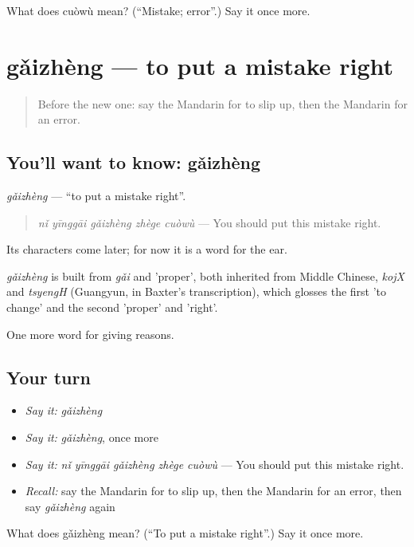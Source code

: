 \begin{tcolorbox}[breakable,colback=teal!4,colframe=teal!35!black,title={Before you move on}]
What does cuòwù mean? (\textquotedblleft{}Mistake; error\textquotedblright{}.) Say it once more.
\end{tcolorbox}
\section[gǎizhèng]{gǎizhèng — to put a mistake right}

\label{lesson:ZH-C356-gaizheng}



\begin{quote}
Before the new one: say the Mandarin for to slip up, then the Mandarin for an error.
\end{quote}

\subsection*{You'll want to know: gǎizhèng}
\emph{gǎizhèng} — \textquotedblleft{}to put a mistake right\textquotedblright{}.

\begin{quote}
\emph{nǐ yīnggāi gǎizhèng zhège cuòwù} — You should put this mistake right.
\end{quote}

Its characters come later; for now it is a word for the ear.

\begin{cousinweb}
\emph{gǎizhèng} is built from \emph{gǎi} and  'proper', both inherited from Middle Chinese, \emph{kojX} and \emph{tsyengH} (Guangyun, in Baxter's transcription), which glosses the first 'to change' and the second 'proper' and 'right'.
\end{cousinweb}

\begin{grammarlens}[title={What you've built}]
One more word for giving reasons.
\end{grammarlens}

\subsection*{Your turn}
\begin{itemize}
\raggedright
  \item \emph{Say it:} \emph{gǎizhèng}
  \item \emph{Say it:} \emph{gǎizhèng}, once more
  \item \emph{Say it:} \emph{nǐ yīnggāi gǎizhèng zhège cuòwù} — You should put this mistake right.
  \item \emph{Recall:} say the Mandarin for to slip up, then the Mandarin for an error, then say \emph{gǎizhèng} again
\end{itemize}

\begin{tcolorbox}[breakable,colback=teal!4,colframe=teal!35!black,title={Before you move on}]
What does gǎizhèng mean? (\textquotedblleft{}To put a mistake right\textquotedblright{}.) Say it once more.
\end{tcolorbox}
